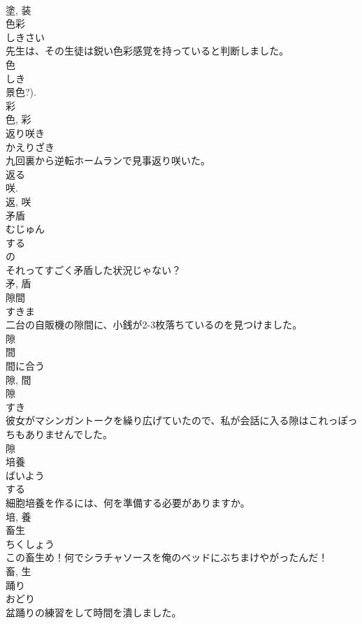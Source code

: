\documentclass[8pt]{extreport}
\begin{document}
\begin{CJK}{UTF8}{min}
\\	塗, 装	
\\	色彩	
\\	しきさい	
\\	先生は、その生徒は鋭い色彩感覚を持っていると判断しました。	
\\	色 
\\	しき 
\\	景色?). 
\\	彩 
\\	色, 彩	
\\	返り咲き	
\\	かえりざき	
\\	九回裏から逆転ホームランで見事返り咲いた。	
\\	返る 
\\	咲. 
\\	返, 咲	
\\	矛盾	
\\	むじゅん	
\\	する 
\\	の 
\\	それってすごく矛盾した状況じゃない？	
\\	矛, 盾	
\\	隙間	
\\	すきま	
\\	二台の自販機の隙間に、小銭が2-3枚落ちているのを見つけました。	
\\	隙 
\\	間 
\\	間に合う 
\\	隙, 間	
\\	隙	
\\	すき	
\\	彼女がマシンガントークを繰り広げていたので、私が会話に入る隙はこれっぽっちもありませんでした。	
\\	隙	
\\	培養	
\\	ばいよう	
\\	する 
\\	細胞培養を作るには、何を準備する必要がありますか。	
\\	培, 養	
\\	畜生	
\\	ちくしょう	
\\	この畜生め！何でシラチャソースを俺のベッドにぶちまけやがったんだ！	
\\	畜, 生	
\\	踊り	
\\	おどり	
\\	盆踊りの練習をして時間を潰しました。	

\end{CJK}
\end{document}
